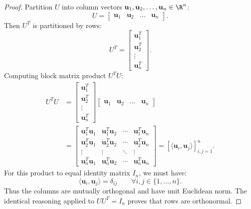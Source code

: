 \begin{proof}
Partition $U$ into column vectors $\mathbf{u}_1, \mathbf{u}_2, \dots, \mathbf{u}_n \in \R^n$:
\begin{equation}
    U = \begin{bmatrix} \mathbf{u}_1 & \mathbf{u}_2 & \dots & \mathbf{u}_n \end{bmatrix}.
\end{equation}
Then $U^T$ is partitioned by rows:
\begin{equation}
    U^T = \begin{bmatrix} \mathbf{u}_1^T \\ \mathbf{u}_2^T \\ \vdots \\ \mathbf{u}_n^T \end{bmatrix}.
\end{equation}
Computing block matrix product $U^T U$:
\begin{align}
    U^T U &= \begin{bmatrix} \mathbf{u}_1^T \\ \mathbf{u}_2^T \\ \vdots \\ \mathbf{u}_n^T \end{bmatrix} \begin{bmatrix} \mathbf{u}_1 & \mathbf{u}_2 & \dots & \mathbf{u}_n \end{bmatrix} \nonumber \\
    &= \begin{bmatrix}
        \mathbf{u}_1^T \mathbf{u}_1 & \mathbf{u}_1^T \mathbf{u}_2 & \cdots & \mathbf{u}_1^T \mathbf{u}_n \\
        \mathbf{u}_2^T \mathbf{u}_1 & \mathbf{u}_2^T \mathbf{u}_2 & \cdots & \mathbf{u}_2^T \mathbf{u}_n \\
        \vdots & \vdots & \ddots & \vdots \\
        \mathbf{u}_n^T \mathbf{u}_1 & \mathbf{u}_n^T \mathbf{u}_2 & \cdots & \mathbf{u}_n^T \mathbf{u}_n
    \end{bmatrix} = \left[ \langle \mathbf{u}_i, \mathbf{u}_j \rangle \right]_{i,j=1}^n.
\end{align}
For this product to equal identity matrix $I_n$, we must have:
\begin{equation}
    \langle \mathbf{u}_i, \mathbf{u}_j \rangle = \delta_{ij} \qquad \forall i, j \in \{1, \dots, n\}.
\end{equation}
Thus the columns are mutually orthogonal and have unit Euclidean norm. The identical reasoning applied to $U U^T = I_n$ proves that rows are orthonormal.
\end{proof}

